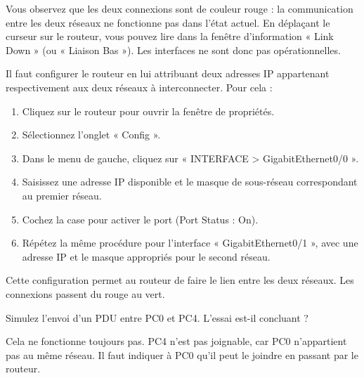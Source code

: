 \documentclass[
  french,
  10pt,
  a4paper,
]{scrartcl}
\providecommand{\tightlist}{%
  \setlength{\itemsep}{0pt}\setlength{\parskip}{0pt}}
\begin{document}
Vous observez que les deux connexions sont de couleur rouge : la
communication entre les deux réseaux ne fonctionne pas dans l'état
actuel. En déplaçant le curseur sur le routeur, vous pouvez lire dans la
fenêtre d'information « Link Down » (ou « Liaison Bas »). Les interfaces
ne sont donc pas opérationnelles.

Il faut configurer le routeur en lui attribuant deux adresses IP
appartenant respectivement aux deux réseaux à interconnecter. Pour cela
:

\begin{enumerate}
\def\labelenumi{\arabic{enumi}.}
\tightlist
\item
  Cliquez sur le routeur pour ouvrir la fenêtre de propriétés.
\item
  Sélectionnez l'onglet « Config ».
\item
  Dans le menu de gauche, cliquez sur « INTERFACE \textgreater{}
  GigabitEthernet0/0 ».
\item
  Saisissez une adresse IP disponible et le masque de sous-réseau
  correspondant au premier réseau.
\item
  Cochez la case pour activer le port (Port Status : On).
\item
  Répétez la même procédure pour l'interface « GigabitEthernet0/1 »,
  avec une adresse IP et le masque appropriés pour le second réseau.
\end{enumerate}

Cette configuration permet au routeur de faire le lien entre les deux
réseaux. Les connexions passent du rouge au vert.

\begin{tcolorbox}[enhanced jigsaw, arc=.35mm, bottomrule=.15mm, bottomtitle=1mm, breakable, colback=white, colbacktitle=quarto-callout-note-color!10!white, colframe=quarto-callout-note-color-frame, coltitle=black, left=2mm, leftrule=.75mm, opacityback=0, opacitybacktitle=0.6, rightrule=.15mm, title=\textcolor{quarto-callout-note-color}{\faInfo}\hspace{0.5em}{Question 9}, titlerule=0mm, toprule=.15mm, toptitle=1mm]

Simulez l'envoi d'un PDU entre PC0 et PC4. L'essai est-il concluant ?

\end{tcolorbox}

Cela ne fonctionne toujours pas. PC4 n'est pas joignable, car PC0
n'appartient pas au même réseau. Il faut indiquer à PC0 qu'il peut le
joindre en passant par le routeur.
\end{document}
